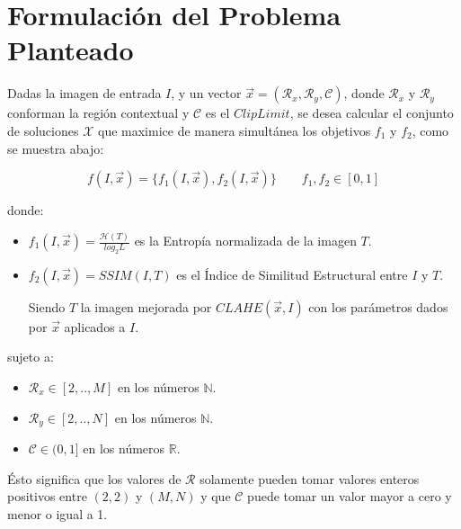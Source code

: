 \documentclass[spanish,twocolumn]{article}
\begin{document}
\section{Formulación del Problema Planteado}
\label{sec:formulacion}

Dadas la imagen de entrada $I$, y un vector $\overrightarrow{x}=(\mathcal{R}_x, \mathcal{R}_y, \mathcal{C})$, donde $\mathcal{R}_x$ y $\mathcal{R}_y$ conforman la región contextual y $\mathscr{C}$ es el $Clip Limit$, se desea calcular el conjunto de soluciones $\mathscr{X}$ que maximice de manera simultánea los objetivos $f_1$ y $f_2$, como se muestra abajo:

\begin{equation}\label{eq:fitness}
    f(I, \overrightarrow{x}) = \{ f_1(I, \overrightarrow{x}), f_2(I, \overrightarrow{x}) \} \qquad f_1,f_2 \in [0,1]
\end{equation}

donde:
\begin{itemize}
\item $f_{1}(I, \overrightarrow{x})=\frac{\mathscr{H}(T)}{log_{2}L}$ es la Entropía normalizada de la imagen $T$.%
\item $f_{2}(I, \overrightarrow{x})=SSIM(I,T)$ es el Índice de Similitud Estructural entre $I$ y $T$.

Siendo $T$ la imagen mejorada por $CLAHE(\overrightarrow{x},I)$ con los parámetros dados por $\overrightarrow{x}$ aplicados a $I$.

\end{itemize}

sujeto a:

\begin{itemize}
\item $\mathcal{R}_x \in [2,..,M]$ en los números $\mathbb{N}$.
\item $\mathcal{R}_y \in [2,..,N]$ en los números $\mathbb{N}$.
\item $\mathscr{C} \in (0,1]$ en los números $\mathbb{R}$.
\end{itemize}

Ésto significa que los valores de $\mathcal{R}$ solamente pueden tomar valores enteros positivos entre $(2,2)$ y $(M,N)$ y que $\mathscr{C}$ puede tomar un valor mayor a cero y menor o igual a 1.
\end{document}

